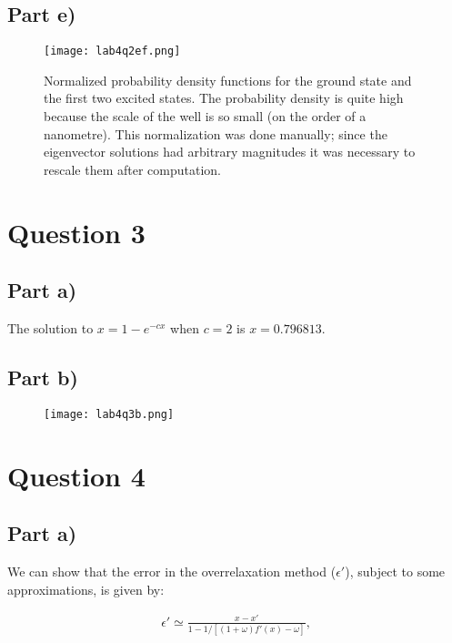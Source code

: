 \documentclass[a4paper,12pt]{article}
\begin{document}
\subsection{Part e)}

\begin{figure}[H]
\centering
\texttt{[image: lab4q2ef.png]}
\caption{Normalized probability density functions for the ground state and the first two excited states. The probability density is quite high because the scale of the well is so small (on the order of a nanometre). This normalization was done manually; since the eigenvector solutions had arbitrary magnitudes it was necessary to rescale them after computation.}
\label{fig:q2ei}
\end{figure}

\section{Question 3}

\subsection{Part a)}

The solution to $x = 1 - e^{-cx}$ when $c = 2$ is $x = 0.796813$.

\subsection{Part b)}

\begin{figure}[H]
\centering
\texttt{[image: lab4q3b.png]}
\caption{}
\label{fig:q3}
\end{figure}

\section{Question 4}

\subsection{Part a)}

We can show that the error in the overrelaxation method ($\epsilon '$), subject to some approximations, is given by:

\begin{eqnarray}
\epsilon'\simeq \frac{x-x'}{1 - 1/[(1+\omega)f'(x)-\omega]},\label{eqn:eps}
\end{eqnarray}
\end{document}
